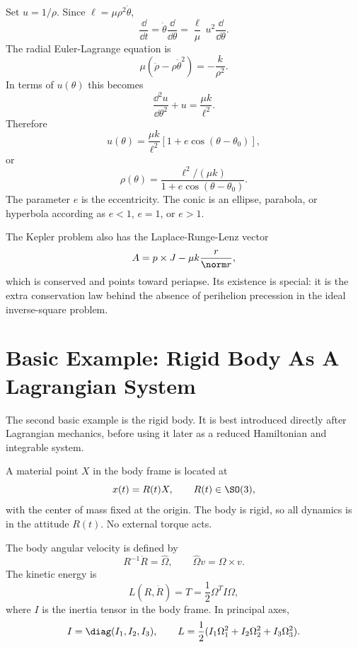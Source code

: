 \begin{derivation}
Set \(u=1/\rho\). Since \(\ell=\mu\rho^2\dot\theta\),
\[
  \frac{\dd}{\dd t}=\dot\theta\frac{\dd}{\dd\theta}
  =
  \frac{\ell}{\mu}\,u^2\frac{\dd}{\dd\theta}.
\]
The radial Euler-Lagrange equation is
\[
  \mu(\ddot\rho-\rho\dot\theta^2)=-\frac{k}{\rho^2}.
\]
In terms of \(u(\theta)\) this becomes
\[
  \frac{\dd^2u}{\dd\theta^2}+u=\frac{\mu k}{\ell^2}.
\]
Therefore
\[
  u(\theta)=\frac{\mu k}{\ell^2}\left[1+e\cos(\theta-\theta_0)\right],
\]
or
\[
  \boxed{
  \rho(\theta)=
  \frac{\ell^2/(\mu k)}{1+e\cos(\theta-\theta_0)}
  }.
\]
The parameter \(e\) is the eccentricity. The conic is an ellipse, parabola, or
hyperbola according as \(e<1\), \(e=1\), or \(e>1\).
\end{derivation}

The Kepler problem also has the Laplace-Runge-Lenz vector
\[
  A=p\times J-\mu k\frac{r}{\norm r},
\]
which is conserved and points toward periapse. Its existence is special: it is
the extra conservation law behind the absence of perihelion precession in the
ideal inverse-square problem.

\section{Basic Example: Rigid Body As A Lagrangian System}
\label{sec:rigid-body-lagrangian}

The second basic example is the rigid body. It is best introduced directly after
Lagrangian mechanics, before using it later as a reduced Hamiltonian and
integrable system.

\begin{assumption}
A material point \(X\) in the body frame is located at
\[
  x(t)=R(t)X,
  \qquad R(t)\in\SO(3),
\]
with the center of mass fixed at the origin. The body is rigid, so all dynamics
is in the attitude \(R(t)\). No external torque acts.
\end{assumption}

The body angular velocity is defined by
\[
  R^{-1}\dot R=\widehat\Omega,
  \qquad
  \widehat\Omega v=\Omega\times v.
\]
The kinetic energy is
\[
  L(R,\dot R)=T
  =
  \frac12\Omega^TI\Omega,
\]
where \(I\) is the inertia tensor in the body frame. In principal axes,
\[
  I=\diag(I_1,I_2,I_3),
  \qquad
  L=\frac12(I_1\Omega_1^2+I_2\Omega_2^2+I_3\Omega_3^2).
\]

